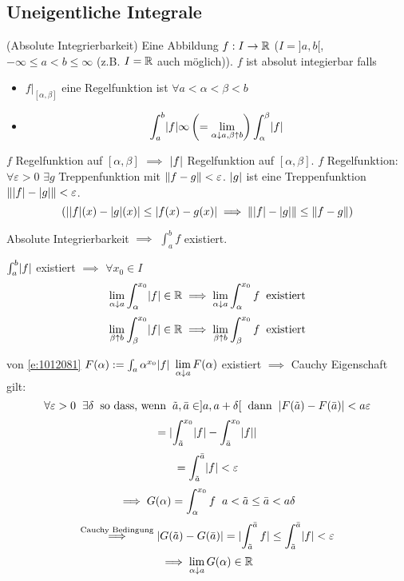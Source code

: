 \subsection{Uneigentliche Integrale}
\begin{Def}{(Absolute Integrierbarkeit)}
  Eine Abbildung $f:I\to\mathbb{R}$ ($I=]a,b[$, $-\infty\leq a < b \leq \infty$ (z.B. $I=\mathbb{R}$ auch möglich)). $f$ ist absolut integierbar falls
  \begin{itemize}
    \item $f|_{[\alpha,\beta]}$ eine Regelfunktion ist $\forall a<\alpha<\beta<b$
    \item 
      \[\int_a^b\mathopen| f \mathclose|\infty \left( =\lim_{\alpha\downarrow a, \beta\uparrow b}\right)\int_\alpha^\beta\mathopen| f \mathclose|\]
  \end{itemize}
\end{Def}
\begin{Bem}
  $f$ Regelfunktion auf $[\alpha,\beta]$ $\implies$ $\mathopen| f \mathclose|$ Regelfunktion auf $[\alpha,\beta]$. $f$ Regelfunktion: $\forall \varepsilon>0$ $\exists g$ Treppenfunktion mit $\left\| f-g \right\|<\varepsilon$. $\mathopen| g \mathclose|$ ist eine Treppenfunktion $\left\| \mathopen| f \mathclose|-\mathopen| g \mathclose| \right\|<\varepsilon$.
  \[\left( \mathopen| \mathopen| f \mathclose|(x)-\mathopen| g \mathclose|(x) \mathclose|\leq\mathopen| f(x)-g(x) \mathclose|\implies \left\| \mathopen| f \mathclose|-\mathopen| g \mathclose| \right\|\leq\left\| f-g \right\| \right)\]
\end{Bem}
\begin{Sat}
  Absolute Integrierbarkeit $\implies$ $\int_a^b f$ existiert.
\end{Sat}
\begin{Bew}
  $\int_a^b\mathopen| f \mathclose|$ existiert $\implies$ $\forall x_0\in I$
  \begin{equation}\label{e:1012081}
    \displaystyle\lim_{\alpha\downarrow a}\int_\alpha^{x_0}\mathopen| f \mathclose|\in\mathbb{R}\implies\displaystyle\lim_{\alpha\downarrow a}\int_\alpha^{x_0}f\hspace{2mm}\text{existiert}
  \end{equation}
  \begin{equation}\label{e:1012082}
    \displaystyle\lim_{\beta\uparrow b}\int_\beta^{x_0}\mathopen| f \mathclose|\in\mathbb{R}\implies\displaystyle\lim_{\beta\uparrow b}\int_\beta^{x_0}f\hspace{2mm}\text{existiert}
  \end{equation}
\end{Bew}
\begin{Bew}{von \ref{e:1012081}} $F(\alpha):=\int_a\alpha^{x_0}\mathopen| f \mathclose|$ $\displaystyle\lim_{\alpha\downarrow a} F(\alpha)$ existiert $\implies$ Cauchy Eigenschaft gilt:
  \[\forall \varepsilon>0\hspace{2mm}\exists\delta\hspace{2mm}\text{so dass, wenn}\hspace{2mm}\tilde a,\bar a\in]a,a+\delta[\hspace{2mm}\text{dann}\hspace{2mm}\mathopen| F(\tilde a)-F(\bar a) \mathclose| < a\varepsilon\]
  \[= \mathopen| \int_{\tilde{a}}^{x_0}\mathopen| f \mathclose|-\int_{\bar{a}}^{x_0} \mathopen| f \mathclose|  \mathclose| \]
  \[=\int_{\tilde{a}}^{\bar{a}}\mathopen| f \mathclose|<\varepsilon\]
  \[\implies G(\alpha)=\int_\alpha^{x_0}f\hspace{2mm} a<\tilde{a}\leq \bar{a}<a\delta\]
  \[\stackrel{\text{Cauchy Bedingung}}{\implies} \mathopen| G(\tilde a)-G(\bar a) \mathclose|=\mathopen| \int_{\tilde{a}}^{\bar{a}}f \mathclose|\leq \int_{\tilde{a}}^{\bar{a}}\mathopen| f \mathclose|<\varepsilon\]
  \[\implies \displaystyle\lim_{\alpha\downarrow a}G(\alpha)\in\mathbb{R}\]
\end{Bew}
